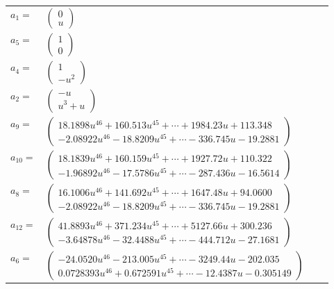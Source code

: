 \documentclass[1p]{elsarticle_modified}
\theoremstyle{definition}
\begin{document}
\begin{tabular}{m{7pt} m{180pt} m{7pt} m{180pt} }
\flushright $a_{1}=$&$\begin{pmatrix}0\\u\end{pmatrix}$ \\
\flushright $a_{5}=$&$\begin{pmatrix}1\\0\end{pmatrix}$ \\
\flushright $a_{4}=$&$\begin{pmatrix}1\\- u^2\end{pmatrix}$ \\
\flushright $a_{2}=$&$\begin{pmatrix}- u\\u^3+u\end{pmatrix}$ \\
\flushright $a_{9}=$&$\begin{pmatrix}18.1898 u^{46}+160.513 u^{45}+\cdots+1984.23 u+113.348\\-2.08922 u^{46}-18.8209 u^{45}+\cdots-336.745 u-19.2881\end{pmatrix}$ \\
\flushright $a_{10}=$&$\begin{pmatrix}18.1839 u^{46}+160.159 u^{45}+\cdots+1927.72 u+110.322\\-1.96892 u^{46}-17.5786 u^{45}+\cdots-287.436 u-16.5614\end{pmatrix}$ \\
\flushright $a_{8}=$&$\begin{pmatrix}16.1006 u^{46}+141.692 u^{45}+\cdots+1647.48 u+94.0600\\-2.08922 u^{46}-18.8209 u^{45}+\cdots-336.745 u-19.2881\end{pmatrix}$ \\
\flushright $a_{12}=$&$\begin{pmatrix}41.8893 u^{46}+371.234 u^{45}+\cdots+5127.66 u+300.236\\-3.64878 u^{46}-32.4488 u^{45}+\cdots-444.712 u-27.1681\end{pmatrix}$ \\
\flushright $a_{6}=$&$\begin{pmatrix}-24.0520 u^{46}-213.005 u^{45}+\cdots-3249.44 u-202.035\\0.0728393 u^{46}+0.672591 u^{45}+\cdots-12.4387 u-0.305149\end{pmatrix}$ \\

\end{tabular}
\end{document}

